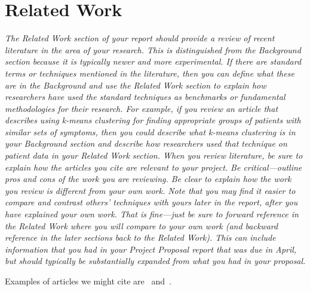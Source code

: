 \section{Related Work}

\emph{The Related Work section of your report should provide a review of recent literature in the area of your research. This is distinguished from the Background section because it is typically newer and more experimental. If there are standard terms or techniques mentioned in the literature, then you can define what these are in the Background and use the Related Work section to explain how researchers have used the standard techniques as benchmarks or fundamental methodologies for their research. For example, if you review an article that describes using k-means clustering for finding appropriate groups of patients with similar sets of symptoms, then you could describe what k-means clustering is in your Background section and describe how researchers used that technique on patient data in your Related Work section. When you review literature, be sure to explain how the articles you cite are relevant to your project. Be critical---outline pros and cons of the work you are reviewing. Be clear to explain how the work you review is different from your own work. Note that you may find it easier to compare and contrast others' techniques with yours later in the report, after you have explained your own work. That is fine---just be sure to forward reference in the Related Work where you will compare to your own work (and backward reference in the later sections back to the Related Work). This can include information that you had in your Project Proposal report that was due in April, but should typically be substantially expanded from what you had in your proposal.}

Examples of articles we might cite are~\cite{Doe11} and~\cite{JohSil05}.
